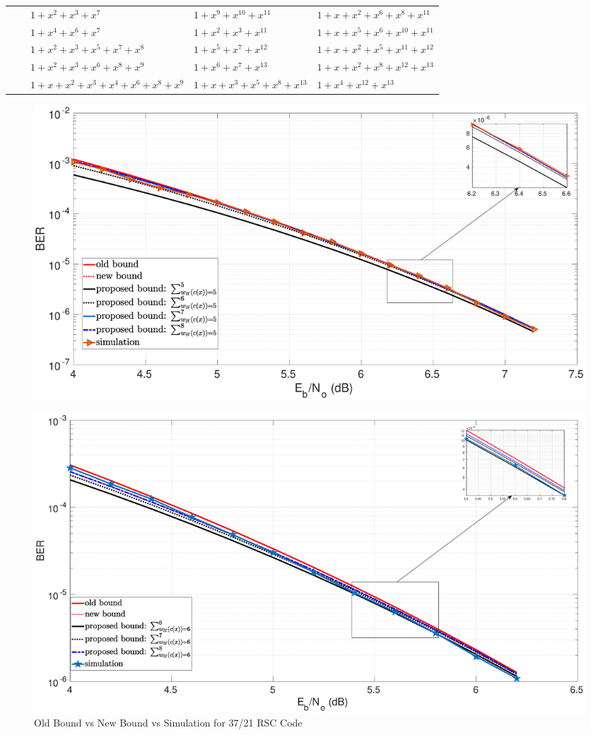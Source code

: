 \begin{table}[htbp]
\begin{tabularx}{1.2\textwidth}{|c|c|XXX}
			&&$1+x^2+x^3+x^7$ 						& $1+x^9+x^{10}+x^{11}$ 			& $1+x+x^{2}+x^{6}+x^8+x^{11}$\\
			&&$1+x^4+x^6+x^7$ 						& $1+x^2+x^3+x^{11}$ 				& $1+x+x^{5}+x^6+x^{10}+x^{11}$\\
			&&$1+x^2+x^3+x^5+x^7+x^8$ 			& $1+x^5+x^7+x^{12}$ 				& $1+x+x^{2}+x^5+x^{11}+x^{12}$\\
			&&$1+x^2+x^3+x^6+x^8+x^9$ 			& $1+x^6+x^7+x^{13}$ 				& $1+x+x^2+x^8+x^{12}+x^{13}$\\
			&&$1+x+x^2+x^3+x^4+x^6+x^8+x^9$ 	& $1+x+x^3+x^5+x^8+x^{13}$ 		& $1+x^{4}+x^{12}+x^{13}$\\
			\bottomrule
		\end{tabularx}		
		\label{code-tables-3}
	\end{table}



\begin{figure}[htbp]
	\centering
	\includegraphics[width=1\textwidth]{./Images/RSC_5_7_lower_weights3.eps}
	\label{simFig1}
\end{figure}


\begin{figure}[htbp]
	\centering
	\includegraphics[width=1\textwidth]{./Images/RSC_37_21_lower_weights3.eps}
	\caption{Old Bound vs New Bound vs Simulation for 37/21 RSC Code}
	\label{simFig2}
\end{figure}


